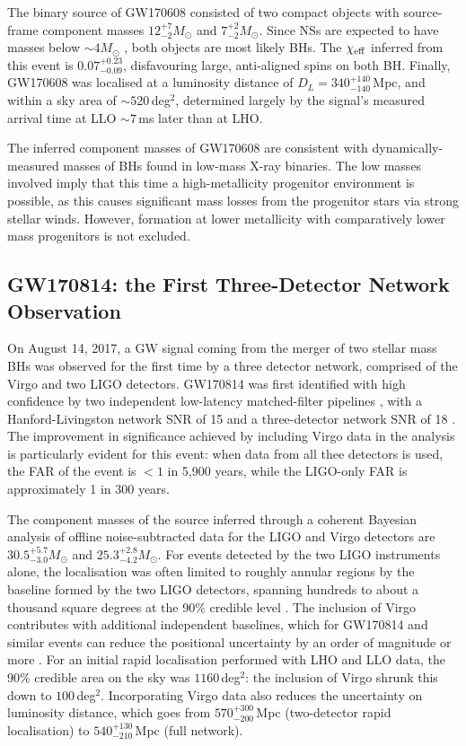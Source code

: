 \documentclass[binding=0.6cm, LaM]{sapthesis}
\begin{document}
	The binary source of GW170608 consisted of two compact objects with source-frame component masses 
	$12^{+7}_{-2}M_\odot$ and $7^{+2}_{-2}M_\odot$.
	Since NSs are expected to have masses below $\sim 4M_\odot$ \cite{141},
	both objects are most likely BHs. 
	The $\chi_{\rm eff}$ inferred from this event is $0.07^{+0.23}_{−0.09}$,
	disfavouring large, anti-aligned spins on both BH.
        Finally, GW170608 was localised at a luminosity distance of $D_L = 340^{+140}_{−140}\,$Mpc, 
	and within a sky area of $\sim 520\,$deg$^2$, determined largely by the signal's measured arrival time at LLO $\sim 7$\,ms later than at LHO.
 
	The inferred component masses of GW170608 are consistent with 
	dynamically-measured masses of BHs found in low-mass X-ray binaries.
	The low masses involved imply that this time a high-metallicity progenitor environment is possible, 
	as this causes significant mass losses from the progenitor stars via strong stellar winds.
	However, formation at lower metallicity with comparatively lower mass progenitors is not excluded.

\subsection{GW170814: the First Three-Detector Network Observation}	
	On August 14, 2017, a GW signal coming from the merger of two stellar mass BHs 
	was observed for the first time by a three detector network, comprised of the Virgo and two LIGO detectors. 
	GW170814 was first identified with high confidence by two independent 
	low-latency matched-filter pipelines \cite{111,112,114,146},
	with a Hanford-Livingston network SNR of 15 and a three-detector network SNR of 18 \cite{114,150,151}.
	The improvement in significance achieved by including Virgo data in the analysis is particularly evident 
	for this event: when data from all thee detectors is used, 
	the FAR of the event is $< 1$ in 5,900 years, while the LIGO-only FAR is approximately 1 in 300 years.

	The component masses of the source inferred through a coherent Bayesian analysis \cite{93, 152} 
	of offline noise-subtracted data for the LIGO and Virgo detectors 
        are $30.5^{+5.7}_{-3.0}M_\odot$ and $25.3^{+2.8}_{-4.2}M_\odot$.
	For events detected by the two LIGO instruments alone, the localisation 
	was often limited to roughly annular regions by the baseline formed by the two LIGO detectors,
	spanning hundreds to about a thousand square degrees at the 90\% credible level \cite{89,155,156}. 
	The inclusion of Virgo contributes with additional independent baselines, 
	which for GW170814 and similar events can reduce the positional uncertainty by an order of magnitude or more \cite{155}. 
	For an initial rapid localisation performed with LHO and LLO data, 
	the 90\% credible area on the sky was $1160\,$deg$^2$: the inclusion of Virgo shrunk this down to $100\,$deg$^2$.
	Incorporating Virgo data also reduces the uncertainty on luminosity distance, 
	which goes from $570^{+300}_{-200}\,$Mpc (two-detector rapid localisation) to $540^{+130}_{-210}\,$Mpc (full network).
\end{document}
